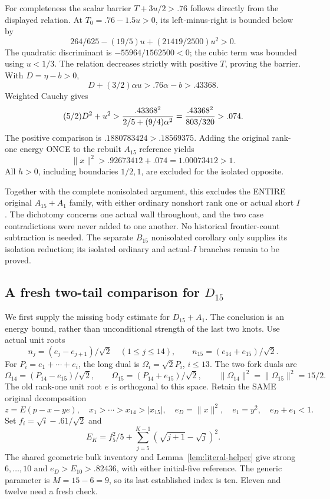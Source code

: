 For completeness the scalar barrier \(T+3u/2>.76\) follows
directly from the displayed relation.
At \(T_0=.76-1.5u>0\), its left-minus-right is bounded below by
\[
                  264/625-(19/5)u+(21419/2500)u^2>0 .
\]
The quadratic discriminant is \(-55964/1562500<0\);
the cubic term was bounded using \(u<1/3\).
The relation decreases strictly with positive \(T\), proving
the barrier.
With \(D=\eta-b>0\),
\[
 D+(3/2)\alpha u>.76\alpha-b>.43368.
\]
Weighted Cauchy gives
\[
 (5/2)D^2+u^2>
 {.43368^2\over2/5+(9/4)\alpha^2}
 ={.43368^2\over803/320}>.074 .
\]
The positive comparison is
\(.1880783424>.18569375\).
Adding the original rank-one energy ONCE to the rebuilt
\(A_{15}\) reference yields
\[
                     \|x\|^2>.92673412+.074=1.00073412>1 .
\]
All \(h>0\), including boundaries \(1/2,1\), are excluded
for the isolated opposite.

Together with the complete nonisolated argument, this excludes
the ENTIRE original \(A_{15}+A_1\) family, with either ordinary
nonshort rank one or actual short \(I\).
The dichotomy concerns one actual wall throughout, and the two
case contradictions were never added to one another.
No historical frontier-count subtraction is needed.
The separate \(B_{15}\) nonisolated corollary only supplies its
isolation reduction; its isolated ordinary and actual-\(I\)
branches remain to be proved.
\subsection{A fresh two-tail comparison for \(D_{15}\)}
\label{app:arithD15body}

We first supply the missing body estimate for \(D_{15}+A_1\).
The conclusion is an energy bound, rather than unconditional
strength of the last two knots.
Use actual unit roots
\[
 n_j=(e_j-e_{j+1})/\sqrt2\quad(1\le j\le14),\qquad
 n_{15}=(e_{14}+e_{15})/\sqrt2 .
\]
For \(P_i=e_1+\cdots+e_i\), the long dual is
\(\Omega_i=\sqrt2P_i\), \(i\le13\).
The two fork duals are
\[
 \Omega_{14}=(P_{14}-e_{15})/\sqrt2,\qquad
 \Omega_{15}=(P_{14}+e_{15})/\sqrt2,\qquad
 \|\Omega_{14}\|^2=\|\Omega_{15}\|^2=15/2 .
\]
The old rank-one unit root \(e\) is orthogonal to this space.
Retain the SAME original decomposition
\[
 z=E(p-x-y e),\quad x_1>\cdots>x_{14}>|x_{15}|,\quad
 e_D=\|x\|^2,\quad e_1=y^2,\quad e_D+e_1<1 .
\]
Set \(f_i=\sqrt i-.61/\sqrt2\) and
\[
 E_K=f_5^2/5+\sum_{j=5}^{K-1}(\sqrt{j+1}-\sqrt j)^2.
\]
The shared geometric bulk inventory and
Lemma~\ref{lem:literal-helper} give strong \(6,\ldots,10\)
and \(e_D>E_{10}>.82436\), with either initial-five reference.
The generic parameter is \(M=15-6=9\), so its last
established index is ten.  Eleven and twelve need a fresh check.

